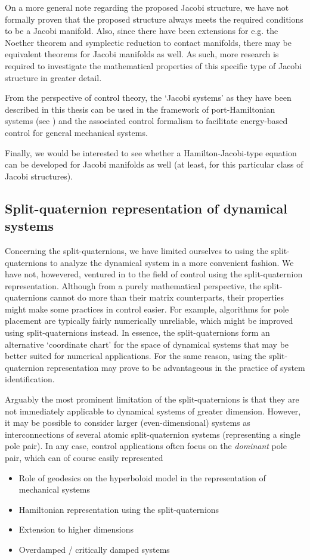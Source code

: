 On a more general note regarding the proposed Jacobi structure, we have not formally proven that the proposed structure always meets the required conditions to be a Jacobi manifold. Also, since there have been extensions for e.g. the Noether theorem and symplectic reduction to contact manifolds, there may be equivalent theorems for Jacobi manifolds as well. As such, more research is required to investigate the mathematical properties of this specific type of Jacobi structure in greater detail.

From the perspective of control theory, the `Jacobi systems' as they have been described in this thesis can be used in the framework of port-Hamiltonian systems (see \citet{VanDerSchaft2006}) and the associated control formalism to facilitate energy-based control for general mechanical systems.

Finally, we would be interested to see whether a Hamilton-Jacobi-type equation can be developed for Jacobi manifolds as well (at least, for this particular class of Jacobi structures).

\subsection*{Split-quaternion representation of dynamical systems}
Concerning the split-quaternions, we have limited ourselves to using the split-quaternions to analyze the dynamical system in a more convenient fashion. We have not, howevered, ventured in to the field of control using the split-quaternion representation. Although from a purely mathematical perspective, the split-quaternions cannot do more than their matrix counterparts, their properties might make some practices in control easier. For example, algorithms for pole placement are typically fairly numerically unreliable, which might be improved using split-quaternions instead. In essence, the split-quaternions form an alternative `coordinate chart' for the space of dynamical systems that may be better suited for numerical applications. For the same reason, using the split-quaternion representation may prove to be advantageous in the practice of system identification.

Arguably the most prominent limitation of the split-quaternions is that they are not immediately applicable to dynamical systems of greater dimension. However, it may be possible to consider larger (even-dimensional) systems as interconnections of several atomic split-quaternion systems (representing a single pole pair). In any case, control applications often focus on the \emph{dominant} pole pair, which can of course easily represented 

\begin{itemize}
    \item Role of geodesics on the hyperboloid model in the representation of mechanical systems
    \item Hamiltonian representation using the split-quaternions
    \item Extension to higher dimensions
    \item Overdamped / critically damped systems
\end{itemize}

